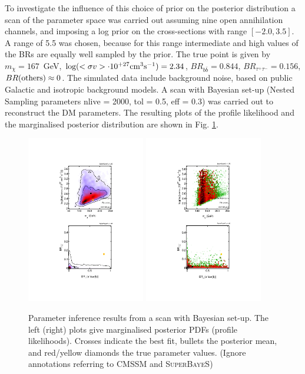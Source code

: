 \documentclass{article}
\begin{document}
To investigate the influence of this choice of prior on the posterior distribution a scan of the parameter space was carried out assuming nine open annihilation channels, and imposing a log prior on the cross-sections with range $[-2.0,3.5]$. A range of 5.5 was chosen, because for this range intermediate and high values of the BRs are equally well sampled by the prior. The true point is given by $m_{\chi} = 167$\ GeV, $\textnormal{log}(<\sigma v> \cdot 10^{+27} \textnormal{cm}^3 \textnormal{s}^{-1}) = 2.34$, $BR_{b \bar{b}} = 0.844$, $BR_{\tau^+ \tau^-} = 0.156$, $BR(\textnormal{others}) \approx 0$. The simulated data include background noise, based on public Galactic and isotropic background models. A scan with Bayesian set-up (Nested Sampling parameters nlive = 2000, tol = 0.5, eff = 0.3) was carried out to reconstruct the DM parameters.
The resulting plots of the profile likelihood and the marginalised posterior distribution are shown in Fig. \ref{Bayesianscan}.
\begin{figure}
\centering
\includegraphics[trim = 140 120 140 120, clip = true, width=0.46\textwidth]{figs/2D_Posterior}
\includegraphics[trim = 140 120 140 120, clip = true, width=0.46\textwidth]{figs/2D_PL}
\caption{Parameter inference results from a scan with Bayesian set-up. The left (right) plots give marginalised posterior PDFs (profile likelihoods).  Crosses indicate the best fit, bullets the posterior mean, and red/yellow diamonds the true parameter values. (Ignore annotations referring to CMSSM and \textsc{SuperBayeS})}
\label{Bayesianscan}
\end{figure}
\end{document}
